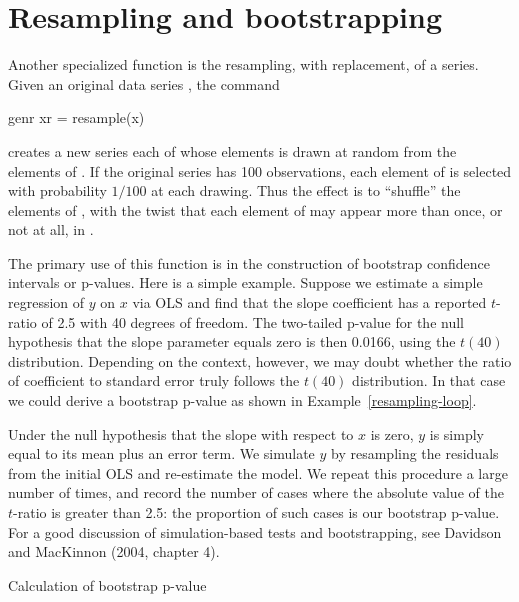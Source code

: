 \section{Resampling and bootstrapping}
\label{genr-resample}

Another specialized function is the resampling, with replacement, of a
series.  Given an original data series , the command
\begin{code}
    genr xr = resample(x)
\end{code}
creates a new series each of whose elements is drawn at random from
the elements of .  If the original series has 100
observations, each element of  is selected with probability
$1/100$ at each drawing.  Thus the effect is to ``shuffle'' the
elements of , with the twist that each element of
 may appear more than once, or not at all, in .

The primary use of this function is in the construction of bootstrap
confidence intervals or p-values.  Here is a simple example.  Suppose
we estimate a simple regression of $y$ on $x$ via OLS and find that
the slope coefficient has a reported $t$-ratio of 2.5 with 40 degrees
of freedom.  The two-tailed p-value for the null hypothesis that the
slope parameter equals zero is then 0.0166, using the $t(40)$
distribution.  Depending on the context, however, we may doubt whether
the ratio of coefficient to standard error truly follows the $t(40)$
distribution.  In that case we could derive a bootstrap p-value as
shown in Example~\ref{resampling-loop}.  

Under the null hypothesis that the slope with respect to $x$ is zero,
$y$ is simply equal to its mean plus an error term.  We simulate $y$
by resampling the residuals from the initial OLS and re-estimate the
model.  We repeat this procedure a large number of times, and record
the number of cases where the absolute value of the $t$-ratio is
greater than 2.5: the proportion of such cases is our bootstrap
p-value.  For a good discussion of simulation-based tests and
bootstrapping, see Davidson and MacKinnon (2004, chapter 4).

\begin{script}[htbp]
  \caption{Calculation of bootstrap p-value}
  \label{resampling-loop}
\end{script}

